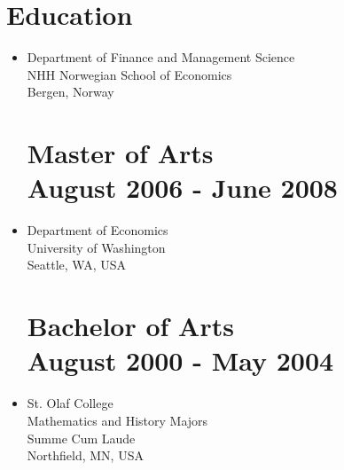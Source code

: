 \documentclass[margin]{res}
\begin{document}
\begin{resume}
\begin{itemize}
\end{itemize}

\section{Education}

\begin{itemize}
\normalsize{\section{Ph.D. Business Economics \\ August 2008 - May 2012}}
\item[] Department of Finance and Management Science\\
NHH Norwegian School of Economics \\
Bergen, Norway \\

\normalsize{\section{\bf Master of Arts \\ August 2006 - June 2008}}
\item[] Department of Economics \\
University of Washington \\
Seattle, WA, USA \\

\normalsize{\section{\bf Bachelor of Arts \\ August 2000 - May 2004}}
\item[] St. Olaf College  \\
Mathematics and History Majors \\
Summe Cum Laude \\
Northfield, MN, USA \\
\end{itemize}


\end{resume}
\end{document}
